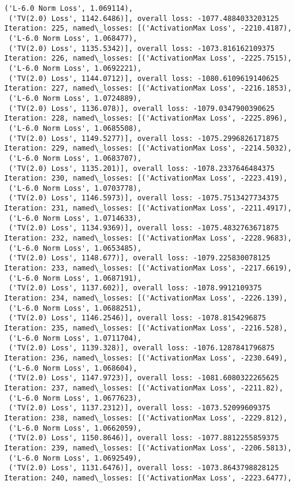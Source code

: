 \documentclass[10pt]{article}
\begin{document}
\begin{Verbatim}[commandchars=\\\{\}]
 ('L-6.0 Norm Loss', 1.069114),
 ('TV(2.0) Loss', 1142.6486)], overall loss: -1077.4884033203125
Iteration: 225, named\_losses: [('ActivationMax Loss', -2210.4187),
 ('L-6.0 Norm Loss', 1.068477),
 ('TV(2.0) Loss', 1135.5342)], overall loss: -1073.816162109375
Iteration: 226, named\_losses: [('ActivationMax Loss', -2225.7515),
 ('L-6.0 Norm Loss', 1.0692221),
 ('TV(2.0) Loss', 1144.0712)], overall loss: -1080.6109619140625
Iteration: 227, named\_losses: [('ActivationMax Loss', -2216.1853),
 ('L-6.0 Norm Loss', 1.0724889),
 ('TV(2.0) Loss', 1136.078)], overall loss: -1079.0347900390625
Iteration: 228, named\_losses: [('ActivationMax Loss', -2225.896),
 ('L-6.0 Norm Loss', 1.0685508),
 ('TV(2.0) Loss', 1149.5277)], overall loss: -1075.2996826171875
Iteration: 229, named\_losses: [('ActivationMax Loss', -2214.5032),
 ('L-6.0 Norm Loss', 1.0683707),
 ('TV(2.0) Loss', 1135.201)], overall loss: -1078.2337646484375
Iteration: 230, named\_losses: [('ActivationMax Loss', -2223.419),
 ('L-6.0 Norm Loss', 1.0703778),
 ('TV(2.0) Loss', 1146.5973)], overall loss: -1075.7513427734375
Iteration: 231, named\_losses: [('ActivationMax Loss', -2211.4917),
 ('L-6.0 Norm Loss', 1.0714633),
 ('TV(2.0) Loss', 1134.9369)], overall loss: -1075.4832763671875
Iteration: 232, named\_losses: [('ActivationMax Loss', -2228.9683),
 ('L-6.0 Norm Loss', 1.0653485),
 ('TV(2.0) Loss', 1148.677)], overall loss: -1079.225830078125
Iteration: 233, named\_losses: [('ActivationMax Loss', -2217.6619),
 ('L-6.0 Norm Loss', 1.0687191),
 ('TV(2.0) Loss', 1137.602)], overall loss: -1078.9912109375
Iteration: 234, named\_losses: [('ActivationMax Loss', -2226.139),
 ('L-6.0 Norm Loss', 1.0688251),
 ('TV(2.0) Loss', 1146.2546)], overall loss: -1078.8154296875
Iteration: 235, named\_losses: [('ActivationMax Loss', -2216.528),
 ('L-6.0 Norm Loss', 1.0711704),
 ('TV(2.0) Loss', 1139.328)], overall loss: -1076.1287841796875
Iteration: 236, named\_losses: [('ActivationMax Loss', -2230.649),
 ('L-6.0 Norm Loss', 1.068604),
 ('TV(2.0) Loss', 1147.9723)], overall loss: -1081.6080322265625
Iteration: 237, named\_losses: [('ActivationMax Loss', -2211.82),
 ('L-6.0 Norm Loss', 1.0677623),
 ('TV(2.0) Loss', 1137.2312)], overall loss: -1073.52099609375
Iteration: 238, named\_losses: [('ActivationMax Loss', -2229.812),
 ('L-6.0 Norm Loss', 1.0662059),
 ('TV(2.0) Loss', 1150.8646)], overall loss: -1077.8812255859375
Iteration: 239, named\_losses: [('ActivationMax Loss', -2206.5813),
 ('L-6.0 Norm Loss', 1.0692549),
 ('TV(2.0) Loss', 1131.6476)], overall loss: -1073.8643798828125
Iteration: 240, named\_losses: [('ActivationMax Loss', -2223.6477),

\end{Verbatim}
\end{document}
